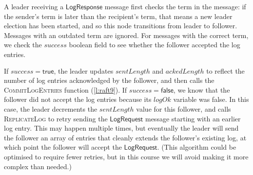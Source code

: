 A leader receiving a $\mathsf{LogResponse}$ message first checks the term in the message: if the sender's term is later than the recipient's term, that means a new leader election has been started, and so this node transitions from leader to follower.
Messages with an outdated term are ignored.
For messages with the correct term, we check the $\mathit{success}$ boolean field to see whether the follower accepted the log entries.

If $\mathit{success} = \mathsf{true}$, the leader updates $\mathit{sentLength}$ and $\mathit{ackedLength}$ to reflect the number of log entries acknowledged by the follower, and then calls the \textsc{CommitLogEntries} function (\autoref{l:raft9}).
If $\mathit{success} = \mathsf{false}$, we know that the follower did not accept the log entries because its $\mathit{logOk}$ variable was false.
In this case, the leader decrements the $\mathit{sentLength}$ value for this follower, and calls \textsc{ReplicateLog} to retry sending the $\mathsf{LogRequest}$ message starting with an earlier log entry.
This may happen multiple times, but eventually the leader will send the follower an array of entries that cleanly extends the follower's existing log, at which point the follower will accept the $\mathsf{LogRequest}$.
(This algorithm could be optimised to require fewer retries, but in this course we will avoid making it more complex than needed.)

%

